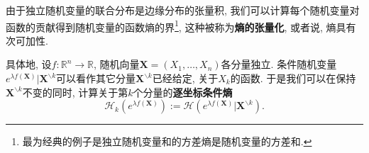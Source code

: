 \sp 

由于独立随机变量的联合分布是边缘分布的张量积, 我们可以计算每个随机变量对函数的贡献得到随机变量的函数熵的界\footnote{最为经典的例子是独立随机变量和的方差熵是随机变量的方差和.}, 这种被称为\textbf{熵的张量化}, 或者说, 熵具有次可加性.


具体地, 设$f \colon \mathbb{R}^n \to \mathbb{R}$, 随机向量$\bm{X} = (X_1, \dots, X_n)$各分量独立. 
条件随机变量$e^{\lambda f(\bm{X})} | \bm{X}^{\backslash k}$可以看作其它分量$\bm{X}^{\backslash k}$已经给定, 关于$X_k$的函数. 
于是我们可以在保持$\bm{X}^{\backslash k}$不变的同时, 计算关于第$k$个分量的\textbf{逐坐标条件熵}
\begin{equation*}
	\mathcal{H}_k ( e^{\lambda f(\bm{X})} )
	:= \mathcal{H} ( e^{\lambda f(\bm{X})} | \bm{X}^{\backslash k} ). 
\end{equation*}

